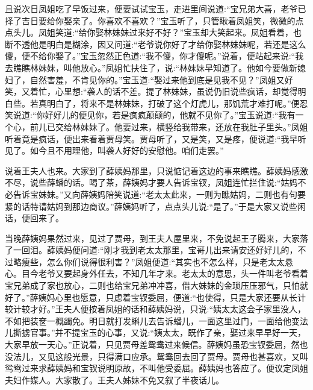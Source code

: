 \begin{parag}
    且说次日凤姐吃了早饭过来，便要试试宝玉，走进里间说道:“宝兄弟大喜，老爷已择了吉日要给你娶亲了。你喜欢不喜欢？”宝玉听了，只管瞅着凤姐笑，微微的点点头儿。凤姐笑道:“给你娶林妹妹过来好不好？”宝玉却大笑起来。凤姐看着，也断不透他是明白是糊涂，因又问道:“老爷说你好了才给你娶林妹妹呢，若还是这么傻，便不给你娶了。”宝玉忽然正色道:“我不傻，你才傻呢。”说着，便站起来说:“我去瞧瞧林妹妹，叫他放心。”凤姐忙扶住了，说:“林妹妹早知道了。他如今要做新媳妇了，自然害羞，不肯见你的。”宝玉道:“娶过来他到底是见我不见？”凤姐又好笑，又着忙，心里想:“袭人的话不差。提了林妹妹，虽说仍旧说些疯话，却觉得明白些。若真明白了，将来不是林妹妹，打破了这个灯虎儿，那饥荒才难打呢。”便忍笑说道:“你好好儿的便见你，若是疯疯颠颠的，他就不见你了。”宝玉说道:“我有一个心，前儿已交给林妹妹了。他要过来，横竖给我带来，还放在我肚子里头。”凤姐听着竟是疯话，便出来看着贾母笑。贾母听了，又是笑，又是疼，便说道:“我早听见了。如今且不用理他，叫袭人好好的安慰他。咱们走罢。”
\end{parag}


\begin{parag}
    说着王夫人也来。大家到了薛姨妈那里，只说惦记着这边的事来瞧瞧。薛姨妈感激不尽，说些薛蟠的话。喝了茶，薛姨妈才要人告诉宝钗，凤姐连忙拦住说:“姑妈不必告诉宝妹妹。”又向薛姨妈陪笑说道:“老太太此来，一则为瞧姑妈，二则也有句要紧的话特请姑妈到那边商议。”薛姨妈听了，点点头儿说:“是了。”于是大家又说些闲话，便回来了。
\end{parag}


\begin{parag}
    当晚薛姨妈果然过来，见过了贾母，到王夫人屋里来，不免说起王子腾来，大家落了一回泪。薛姨妈便问道:“刚才我到老太太那里，宝哥儿出来请安还好好儿的，不过略瘦些，怎么你们说得很利害？”凤姐便道:“其实也不怎么样，只是老太太悬心。目今老爷又要起身外任去，不知几年才来。老太太的意思，头一件叫老爷看着宝兄弟成了家也放心，二则也给宝兄弟冲冲喜，借大妹妹的金琐压压邪气，只怕就好了。”薛姨妈心里也愿意，只虑着宝钗委屈，便道:“也使得，只是大家还要从长计较计较才好。”王夫人便按着凤姐的话和薛姨妈说，只说:“姨太太这会子家里没人，不如把装奁一概蠲免。明日就打发蝌儿去告诉蟠儿，一面这里过门，一面给他变法儿撕掳官事。”并不提宝玉的心事，又说:“姨太太，既作了亲，娶过来早早好一天，大家早放一天心。”正说着，只见贾母差鸳鸯过来候信。薛姨妈虽恐宝钗委屈，然也没法儿，又见这般光景，只得满口应承。鸳鸯回去回了贾母。贾母也甚喜欢，又叫鸳鸯过来求薛姨妈和宝钗说明原故，不叫他受委屈。薛姨妈也答应了。便议定凤姐夫妇作媒人。大家散了。王夫人姊妹不免又叙了半夜话儿。
\end{parag}


